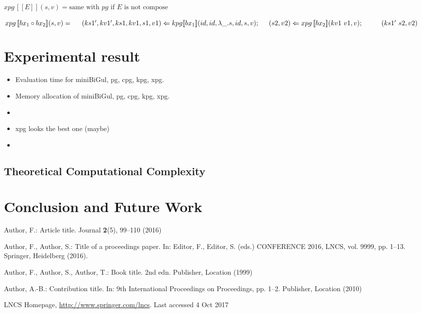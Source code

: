 \documentclass[runningheads]{llncs}
\newcommand{\tab}{\hspace*{5mm}}
\newcommand{\qtab}{\hspace*{5mm} \ \quad}
\newcommand{\kpg}[7]{kpg [\![#1]\!] (#2, #3, #4, #5, #6, #7)}
\newcommand{\xpg}[3]{xpg \, [\![#1]\!] (#2, #3)}
\begin{document}
$\xpg{E}{s}{v} = \text{same with } pg \text{ if } E \text{ is not compose}$

$\xpg{bx_1 \circ bx_2}{s}{v} =\\
    \tab (ks1',kv1', ks1, kv1, s1, v1) \Leftarrow \kpg{bx_1}{id}{id}{\lambda \_.s}{id}{s}{v};\\
    \tab (s2, v2) \Leftarrow \xpg{bx_2}{kv1 \ v1}{v};\\
    \qtab (ks1' \ s2, v2)$

\section{Experimental result}

\begin{itemize}
\item Evaluation time for miniBiGul, pg, cpg, kpg, xpg.
\item Memory allocation of miniBiGul, pg, cpg, kpg, xpg.
\item []
\item xpg looks the best one (maybe)
\item 
\end{itemize}

\subsection{Theoretical Computational Complexity}

\section{Conclusion and Future Work}


% 
%
%
% 
% 
%
\begin{thebibliography}{8}
Author, F.: Article title. Journal \textbf{2}(5), 99--110 (2016)

Author, F., Author, S.: Title of a proceedings paper. In: Editor,
F., Editor, S. (eds.) CONFERENCE 2016, LNCS, vol. 9999, pp. 1--13.
Springer, Heidelberg (2016). 

Author, F., Author, S., Author, T.: Book title. 2nd edn. Publisher,
Location (1999)

Author, A.-B.: Contribution title. In: 9th International Proceedings
on Proceedings, pp. 1--2. Publisher, Location (2010)

LNCS Homepage, \url{http://www.springer.com/lncs}. Last accessed 4
Oct 2017
\end{thebibliography}
\end{document}

